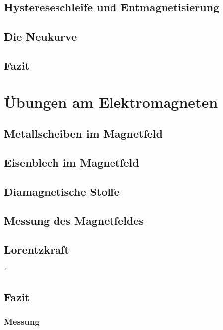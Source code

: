 \documentclass[a4paper,twoside,12pt,DIV=13,BCOR=5mm,numbers=noenddot,cleardoublepage=empty]{scrbook}
\begin{document}
\section{Hystereseschleife und Entmagnetisierung}


\section{Die Neukurve}

\section{Fazit}

\chapter{Übungen am Elektromagneten}
\section{Metallscheiben im Magnetfeld}

\section{Eisenblech im Magnetfeld}

\section{Diamagnetische Stoffe}

\section{Messung des Magnetfeldes}

\section{Lorentzkraft}

´\section{Fazit}



\subsection{Messung} 
\end{document}
